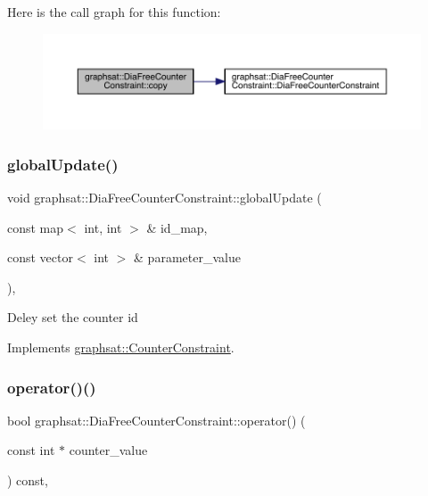 Here is the call graph for this function\+:
\nopagebreak
\begin{figure}[H]
\begin{center}
\leavevmode
\includegraphics[width=350pt]{classgraphsat_1_1_dia_free_counter_constraint_a1405e3fcda5895d1a3d274670a43699e_cgraph}
\end{center}
\end{figure}
\mbox{\label{classgraphsat_1_1_dia_free_counter_constraint_a64d4ec6cb17f6543320bf58ae2b6de01}} 
\subsubsection{\texorpdfstring{globalUpdate()}{globalUpdate()}}
{\footnotesize\ttfamily void graphsat\+::\+Dia\+Free\+Counter\+Constraint\+::global\+Update (\begin{DoxyParamCaption}\item[{const map$<$ int, int $>$ \&}]{id\+\_\+map,  }\item[{const vector$<$ int $>$ \&}]{parameter\+\_\+value }\end{DoxyParamCaption})\hspace{0.3cm}{\ttfamily [inline]}, {\ttfamily [virtual]}}

Deley set the counter id 

Implements \mbox{\hyperlink{classgraphsat_1_1_counter_constraint_aa467ff66b37a1cbc69f5eddb269aaa0d}{graphsat\+::\+Counter\+Constraint}}.

\mbox{\label{classgraphsat_1_1_dia_free_counter_constraint_acb4e5015384b5011ca5347c229b6bb56}} 
\subsubsection{\texorpdfstring{operator()()}{operator()()}}
{\footnotesize\ttfamily bool graphsat\+::\+Dia\+Free\+Counter\+Constraint\+::operator() (\begin{DoxyParamCaption}\item[{const int $\ast$}]{counter\+\_\+value }\end{DoxyParamCaption}) const\hspace{0.3cm}{\ttfamily [inline]}, {\ttfamily [virtual]}}




